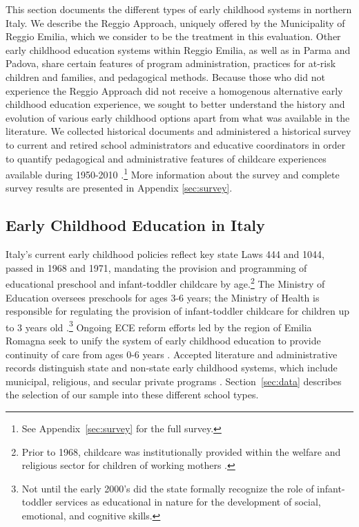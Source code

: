 This section documents the different types of early childhood systems in northern Italy. We describe the Reggio Approach, uniquely offered by the Municipality of Reggio Emilia, which we consider to be the treatment in this evaluation. Other early childhood education systems within Reggio Emilia, as well as in Parma and Padova, share certain features of program administration, practices for at-risk children and families, and pedagogical methods. Because those who did not experience the Reggio Approach did not receive a homogenous alternative early childhood education experience, we sought to better understand the history and evolution of various early childhood options apart from what was available in the literature. We collected historical documents \citep{Padova-Admin-Data_1964-2011,Reggio-Admin-data_1966-2006,Reggio-Annual-Journals_1994-2011} and administered a historical survey to current and retired school administrators and educative coordinators in order to quantify pedagogical and administrative features of childcare experiences available during 1950-2010 \citep{CEHD_2016_Historical-Analysis}.\footnote{See Appendix~\ref{sec:survey} for the full survey.} More information about the survey and complete survey results are presented in Appendix \ref{sec:survey}.

\subsection{Early Childhood Education in Italy}

Italy's current early childhood policies reflect key state Laws 444 and 1044, passed in 1968 and 1971, mandating the provision and programming of educational preschool and infant-toddler childcare by age.\footnote{Prior to 1968, childcare was institutionally provided within the welfare and religious sector for children of working mothers \citep{OECD_2001_Italy-Country-Note,Hohnerlein_2015_Development-and-Diffusion}.} The Ministry of Education oversees preschools for ages 3-6 years; the Ministry of Health is responsible for regulating the provision of infant-toddler childcare for children up to 3 years old \citep{Corsaro_1996_Early-Edu}.\footnote{Not until the early 2000's did the state formally recognize the role of infant-toddler services as educational in nature for the development of social, emotional, and cognitive skills.} Ongoing ECE reform efforts led by the region of Emilia Romagna seek to unify the system of early childhood education to provide continuity of care from ages 0-6 years \citep{CEHD_2016_Historical-Analysis}. Accepted literature and administrative records distinguish state and non-state early childhood systems, which include municipal, religious, and secular private programs \citep{Padova-Admin-Data_1964-2011,Reggio-Admin-data_1966-2006,Reggio-Annual-Journals_1994-2011,OECD_2001_Italy-Country-Note,Ribolzi_2013_Italy}. Section~\ref{sec:data} describes the selection of our sample into these different school types. 

